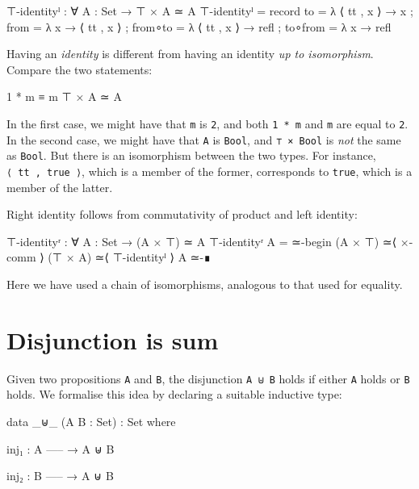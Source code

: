 \begin{fence}
\begin{code}
⊤-identityˡ : ∀ {A : Set} → ⊤ × A ≃ A
⊤-identityˡ =
  record
    { to      = λ{ ⟨ tt , x ⟩ → x }
    ; from    = λ{ x → ⟨ tt , x ⟩ }
    ; from∘to = λ{ ⟨ tt , x ⟩ → refl }
    ; to∘from = λ{ x → refl }
    }
\end{code}
\end{fence}

Having an \emph{identity} is different from having an identity \emph{up
to isomorphism}. Compare the two statements:

\begin{myDisplay}
1 * m ≡ m
⊤ × A ≃ A
\end{myDisplay}

In the first case, we might have that \texttt{m} is \texttt{2}, and both
\texttt{1\ *\ m} and \texttt{m} are equal to \texttt{2}. In the second
case, we might have that \texttt{A} is \texttt{Bool}, and
\texttt{⊤\ ×\ Bool} is \emph{not} the same as \texttt{Bool}. But there
is an isomorphism between the two types. For instance,
\texttt{⟨\ tt\ ,\ true\ ⟩}, which is a member of the former, corresponds
to \texttt{true}, which is a member of the latter.

Right identity follows from commutativity of product and left identity:

\begin{fence}
\begin{code}
⊤-identityʳ : ∀ {A : Set} → (A × ⊤) ≃ A
⊤-identityʳ {A} =
  ≃-begin
    (A × ⊤)
  ≃⟨ ×-comm ⟩
    (⊤ × A)
  ≃⟨ ⊤-identityˡ ⟩
    A
  ≃-∎
\end{code}
\end{fence}

Here we have used a chain of isomorphisms, analogous to that used for
equality.

\hypertarget{disjunction-is-sum}{%
\section{Disjunction is sum}\label{disjunction-is-sum}}

Given two propositions \texttt{A} and \texttt{B}, the disjunction
\texttt{A\ ⊎\ B} holds if either \texttt{A} holds or \texttt{B} holds.
We formalise this idea by declaring a suitable inductive type:

\begin{fence}
\begin{code}
data _⊎_ (A B : Set) : Set where

  inj₁ :
      A
      -----
    → A ⊎ B

  inj₂ :
      B
      -----
    → A ⊎ B
\end{code}
\end{fence}

